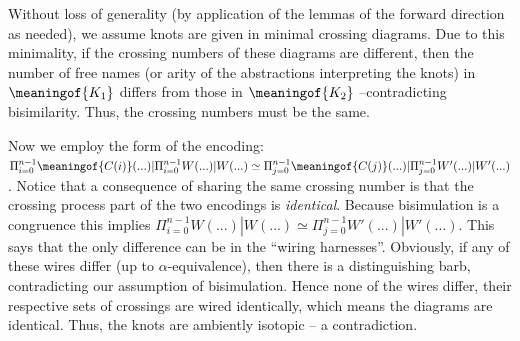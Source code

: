 Without loss of generality (by application of the lemmas of the forward direction as needed), we assume knots are given in minimal
crossing diagrams. Due to this minimality, if the crossing
numbers of these diagrams are different, then the number of free names (or arity of the
abstractions interpreting the knots)  in  $\meaningof{K_1}$  differs from those  in $\meaningof{K_2}$ --contradicting
bisimilarity. Thus, the crossing numbers must be the same. 

Now we employ the form of the encoding: $\Pi_{i=0}^{n-1}
\meaningof{C(i)}(...) | \Pi_{i=0}^{n-1} W(...)|W(...) \simeq
\Pi_{j=0}^{n-1} \meaningof{C(j)}(...) | \Pi_{j=0}^{n-1}
W'(...)|W'(...)$. Notice that a consequence of sharing the same
crossing number is that the crossing process part of the two encodings
is \emph{identical}. Because bisimulation is a congruence this implies
$\Pi_{i=0}^{n-1} W(...)|W(...) \simeq \Pi_{j=0}^{n-1}
W'(...)|W'(...)$. This says that the only difference can be in the
``wiring harnesses''. Obviously, if any of these wires differ (up to $\alpha$-equivalence), then there
is a  distinguishing barb, contradicting our assumption of
bisimulation.  Hence none of the wires differ, their respective sets of crossings are wired
identically, which means the diagrams are identical. Thus, the knots are ambiently isotopic -- a contradiction.

